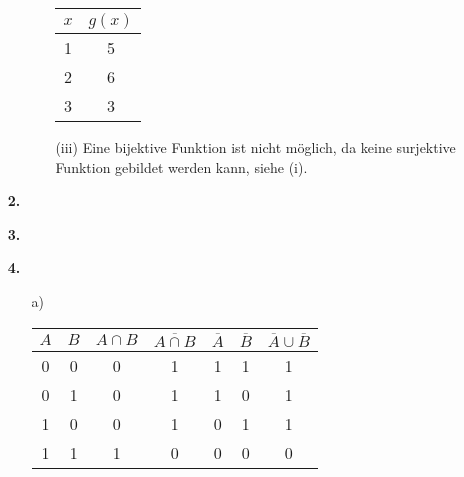 \documentclass[a4paper]{scrartcl}
\begin{document}
\begin{enumerate}
\begin{enumerate}
\begin{enumerate}
{\begin{minipage}[c]{0.5\textwidth}
                            \end{minipage}
                            \begin{minipage}[c]{0.2\textwidth}
                                \begin{tabular}[t]{c|c}
                                    $x$ & $g(x)$\\
                                    \hline
                                    1 & 5\\
                                    2 & 6\\
                                    3 & 3
                                \end{tabular}
                            \end{minipage}
                        }
                        
                    \item[(iii)]
                        Eine bijektive Funktion ist nicht möglich, da keine surjektive Funktion gebildet werden kann, siehe (i).
                \end{enumerate}
        \end{enumerate}

    \item[\textbf{2.}]
    
    \item[\textbf{3.}]
        
    \item[\textbf{4.}]
        \begin{enumerate}
            \item[a)]
                \begin{tabular}[t]{c|c||c|c|c|c|c}
                    $A$ & $B$ & $A \cap B$ & $\overline{A \cap B}$ & $\overline{A}$ & $\overline{B}$ & $\overline{A} \cup \overline{B}$ \\
                    \hline
                    0 & 0 & 0 & 1 & 1 & 1 & 1\\
                    0 & 1 & 0 & 1 & 1 & 0 & 1\\
                    1 & 0 & 0 & 1 & 0 & 1 & 1\\
                    1 & 1 & 1 & 0 & 0 & 0 & 0
                \end{tabular}\\


\end{enumerate}
\end{enumerate}
\end{document}
